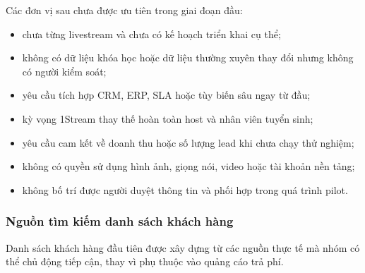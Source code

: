 Các đơn vị sau chưa được ưu tiên trong giai đoạn đầu:

\begin{itemize}
    \item chưa từng livestream và chưa có kế hoạch triển khai cụ thể;
    \item không có dữ liệu khóa học hoặc dữ liệu thường xuyên thay đổi nhưng không có người kiểm soát;
    \item yêu cầu tích hợp CRM, ERP, SLA hoặc tùy biến sâu ngay từ đầu;
    \item kỳ vọng 1Stream thay thế hoàn toàn host và nhân viên tuyển sinh;
    \item yêu cầu cam kết về doanh thu hoặc số lượng lead khi chưa chạy thử nghiệm;
    \item không có quyền sử dụng hình ảnh, giọng nói, video hoặc tài khoản nền tảng;
    \item không bố trí được người duyệt thông tin và phối hợp trong quá trình pilot.
\end{itemize}

\subsubsection{Nguồn tìm kiếm danh sách khách hàng}

Danh sách khách hàng đầu tiên được xây dựng từ các nguồn thực tế mà nhóm có thể chủ động tiếp cận, thay vì phụ thuộc vào quảng cáo trả phí.

